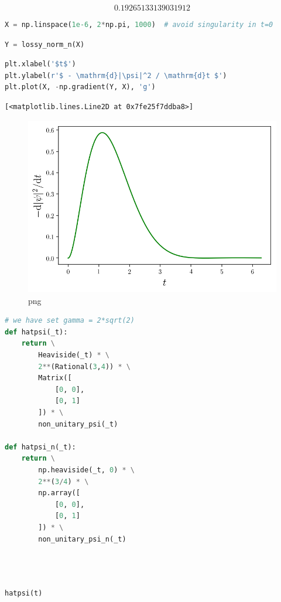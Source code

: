 \[0.19265133139031912\]

\begin{lstlisting}[language=Python]
X = np.linspace(1e-6, 2*np.pi, 1000)  # avoid singularity in t=0
\end{lstlisting}

\begin{lstlisting}[language=Python]
Y = lossy_norm_n(X)
\end{lstlisting}

\begin{lstlisting}[language=Python]
plt.xlabel('$t$')
plt.ylabel(r'$ - \mathrm{d}|\psi|^2 / \mathrm{d}t $')
plt.plot(X, -np.gradient(Y, X), 'g')
\end{lstlisting}

\begin{lstlisting}
[<matplotlib.lines.Line2D at 0x7fe25f7ddba8>]
\end{lstlisting}

\begin{figure}
\centering
\includegraphics[width=0.6\linewidth]{output_46_1.png}
\caption{png}
\end{figure}

\begin{lstlisting}[language=Python]
# we have set gamma = 2*sqrt(2)
def hatpsi(_t):
    return \
        Heaviside(_t) * \
        2**(Rational(3,4)) * \
        Matrix([
            [0, 0],
            [0, 1]
        ]) * \
        non_unitary_psi(_t)
        
def hatpsi_n(_t):
    return \
        np.heaviside(_t, 0) * \
        2**(3/4) * \
        np.array([
            [0, 0],
            [0, 1]
        ]) * \
        non_unitary_psi_n(_t)
        
        
    
\end{lstlisting}

\begin{lstlisting}[language=Python]
hatpsi(t)
\end{lstlisting}

